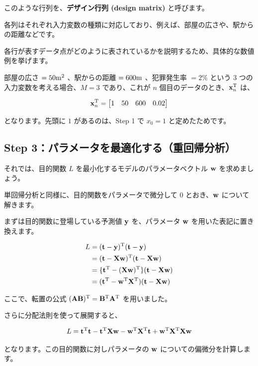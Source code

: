 このような行列を、\textbf{デザイン行列 (design matrix)} と呼びます。

各列はそれぞれ入力変数の種類に対応しており、例えば、部屋の広さや、駅からの距離などです。


各行が表すデータ点がどのように表されているかを説明するため、具体的な数値例を挙げます。

部屋の広さ $= 50{\rm m}^2$ 、駅からの距離 $= 600 {\rm m}$ 、犯罪発生率 $= 2\%$ という 3 つの入力変数を考える場合、$M = 3$ であり、これが $n$ 個目のデータのとき、${\bf x}_n^{\rm T}$ は、


\[
{\bf x}_n^{\rm T} =
\begin{bmatrix}
1 & 50 & 600 & 0.02
\end{bmatrix}
\]


となります。先頭に $1$ があるのは、Step 1 で $x_0 = 1$ と定めたためです。


\subsection{Step 3：パラメータを最適化する（重回帰分析）}


それでは、目的関数 $L$ を最小化するモデルのパラメータベクトル ${\bf w}$ を求めましょう。

単回帰分析と同様に、目的関数をパラメータで微分して 0 とおき、${\bf w}$ について解きます。


まずは目的関数に登場している予測値 ${\bf y}$ を、パラメータ ${\bf w}$ を用いた表記に置き換えます。


\[
\begin{aligned}
L
&= ({\bf t} - {\bf y})^{\rm T} ({\bf t} - {\bf y}) \\
&= ({\bf t} - {\bf X}{\bf w})^{\rm T} ({\bf t} - {\bf X}{\bf w}) \\
&= \{ {\bf t}^{\rm T} - ({\bf X}{\bf w})^{\rm T} \} ({\bf t} - {\bf X}{\bf w}) \\
&= ({\bf t}^{\rm T} - {\bf w}^{\rm T}{\bf X}^{\rm T}) ({\bf t} - {\bf X}{\bf w})
\end{aligned}
\]


ここで、転置の公式 $({\bf A}{\bf B})^{\rm T} = {\bf B}^{\rm T}{\bf A}^{\rm T}$ を用いました。


さらに分配法則を使って展開すると、


\[
L
= {\bf t}^{\rm T}{\bf t}
- {\bf t}^{\rm T}{\bf X}{\bf w}
- {\bf w}^{\rm T}{\bf X}^{\rm T}{\bf t}
+ {\bf w}^{\rm T}{\bf X}^{\rm T}{\bf X}{\bf w}
\]


となります。この目的関数に対しパラメータの ${\bf w}$ についての偏微分を計算します。


